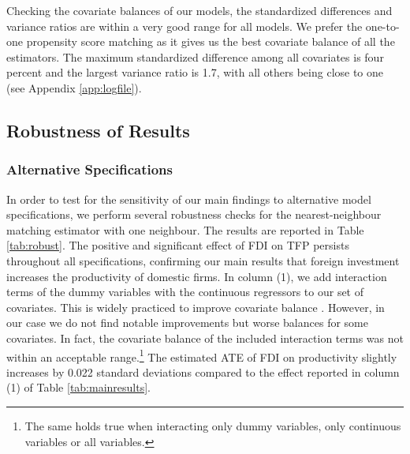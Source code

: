 \documentclass[a4paper,11pt]{scrartcl}
\begin{document}
Checking the covariate balances of our models, the standardized differences and variance ratios are within a very good range for all models. We prefer the one-to-one propensity score matching as it gives us the best covariate balance of all the estimators. The maximum standardized difference among all covariates is four percent and the largest variance ratio is 1.7, with all others being close to one (see Appendix \ref{app:logfile}). 


\subsection{Robustness of Results}

\subsubsection*{Alternative Specifications} 
In order to test for the sensitivity of our main findings to alternative model specifications, we perform several robustness checks for the nearest-neighbour matching estimator with one neighbour. The results are reported in Table \ref{tab:robust}. The positive and significant effect of FDI on TFP persists throughout all specifications, confirming our main results that foreign investment increases the productivity of domestic firms. In column (1), we add interaction terms of the dummy variables with the continuous regressors to our set of covariates. This is widely practiced to improve covariate balance \citep{Caliendo08}. However, in our case we do not find notable improvements but worse balances for some covariates. In fact, the covariate balance of the included interaction terms was not within an acceptable range.\footnote{The same holds true when interacting only dummy variables, only continuous variables or all variables.} The estimated ATE of FDI on productivity slightly increases by 0.022 standard deviations compared to the effect reported in column (1) of Table \ref{tab:mainresults}. 
\newpage
\end{document}
